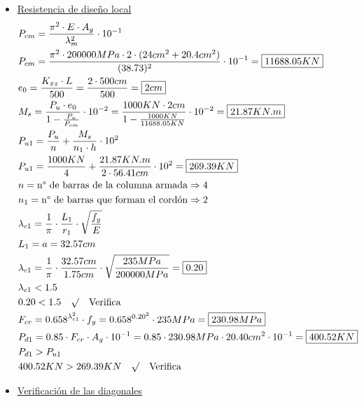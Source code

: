 \begin{enumerate}
\begin{itemize}
\item \underline{Resistencia de diseño local}
\begin{align*}
& P_{cm} = \frac{\pi^2 \cdot E \cdot A_g}{\lambda_m^2} \cdot 10^{-1}\\
& P_{cm} = \frac{\pi^2 \cdot 200000MPa \cdot 2 \cdot (24cm^2+20.4cm^2)}{(38.73)^2} \cdot 10^{-1} = \framebox{$11688.05KN$}\\
& e_0 = \frac{K_{xz} \cdot L}{500} = \frac{2 \cdot 500cm}{500} = \framebox{$2cm$} \\
& M_s = \frac{P_u \cdot e_0}{1-\frac{P_u}{P_{cm}}} \cdot 10^{-2} = \frac{1000KN \cdot 2cm}{1-\frac{1000KN}{11688.05KN}} \cdot 10^{-2} = \framebox{$ 21.87KN.m$} \\
& P_{u1} = \frac{P_u}{n} + \frac{M_s}{n_1 \cdot h} \cdot 10^2 \\
& P_{u1} = \frac{1000KN}{4} + \frac{21.87KN.m}{2 \cdot 56.41cm} \cdot 10^2 = \framebox{$269.39KN$}\\
& n = \text{n° de barras de la columna armada} \Rightarrow 4 \\
& n_1 = \text{n° de barras que forman el cordón} \Rightarrow 2 \\
& \lambda_{c1} = \frac{1}{\pi} \cdot \frac{L_1}{r_1} \cdot \sqrt{\frac{f_y}{E}} \\
& L_1 = a = 32.57cm \\
& \lambda_{c1} = \frac{1}{\pi} \cdot \frac{32.57cm}{1.75cm} \cdot \sqrt{\frac{235MPa}{200000MPa}} = \framebox{$0.20$} \\
& \lambda_{c1} < 1.5 \\
& 0.20 < 1.5 \quad \surd \quad \text{Verifica} \\
& F_{cr} = 0.658^{\lambda_{c1}^2} \cdot f_y = 0.658^{0.20^2} \cdot 235MPa = \framebox{$230.98MPa$}\\
& P_{d1} = 0.85 \cdot F_{cr} \cdot A_g \cdot 10^{-1} = 0.85 \cdot 230.98MPa \cdot 20.40cm^2 \cdot 10^{-1} = \framebox{$400.52KN$} \\
& P_{d1} > P_{u1} \\
& 400.52KN > 269.39KN \quad \surd \quad \text{Verifica} \\
\end{align*}
\newpage
\item \underline{Verificación de las diagonales}


\end{itemize}
\end{enumerate}
